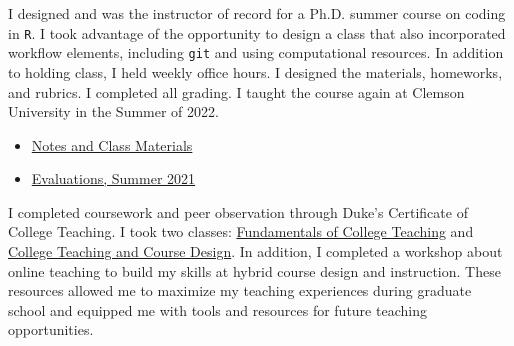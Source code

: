 I designed and was the instructor of record for a Ph.D. summer course on coding in \texttt{R}. I took advantage of the opportunity to design a class that also incorporated workflow elements, including \texttt{git} and using computational resources. In addition to holding class, I held weekly office hours. I designed the materials, homeworks, and rubrics. I completed all grading. I taught the course again at Clemson University in the Summer of 2022.

\begin{itemize}
    \item \href{https://github.com/aziff/R-Workflow-for-Economists}{Notes and Class Materials}
    \item \href{https://www.dropbox.com/s/f8fystdpnxc6don/Ziff_Anna_Econ%20890.pdf?dl=0}{Evaluations, Summer 2021}
\end{itemize}

I completed coursework and peer observation through Duke's Certificate of College Teaching. I took two classes: \href{https://gradschool.duke.edu/professional-development/programs/certificate-college-teaching/coursework-teaching/gs750/}{Fundamentals of College Teaching} and \href{https://gradschool.duke.edu/professional-development/programs/certificate-college-teaching/coursework-teaching/gs755-college/}{College Teaching and Course Design}. In addition, I completed a workshop about online teaching to build my skills at hybrid course design and instruction. These resources allowed me to maximize my teaching experiences during graduate school and equipped me with tools and resources for future teaching opportunities.
















